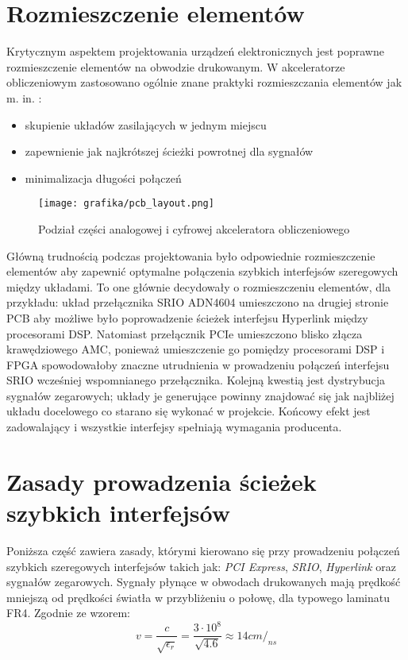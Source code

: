 \section{Rozmieszczenie elementów}
Krytycznym aspektem projektowania urządzeń elektronicznych jest poprawne rozmieszczenie elementów na obwodzie drukowanym. W akceleratorze obliczeniowym zastosowano ogólnie znane praktyki rozmieszczania elementów jak m. in. :
\begin{itemize}
\item
skupienie układów zasilających w jednym miejscu
\item
zapewnienie jak najkrótszej ścieżki powrotnej dla sygnałów
\item
minimalizacja długości połączeń
\end{itemize}

\begin{figure}[!ht]
\centering
\texttt{[image: grafika/pcb\_layout.png]}
\caption{Podział części analogowej i cyfrowej akceleratora obliczeniowego}
\end{figure}

Główną trudnością podczas projektowania było odpowiednie rozmieszczenie elementów aby zapewnić optymalne połączenia szybkich interfejsów szeregowych między układami. To one głównie decydowały o rozmieszczeniu elementów, dla przykładu: układ przełącznika SRIO ADN4604 umieszczono na drugiej stronie PCB aby możliwe było poprowadzenie ścieżek interfejsu Hyperlink między procesorami DSP. Natomiast przełącznik PCIe umieszczono blisko złącza krawędziowego AMC, ponieważ umieszczenie go pomiędzy procesorami DSP i FPGA spowodowałoby znaczne utrudnienia w prowadzeniu połączeń interfejsu SRIO wcześniej wspomnianego przełącznika. Kolejną kwestią jest dystrybucja sygnałów zegarowych; układy je generujące powinny znajdować się jak najbliżej układu docelowego co starano się wykonać w projekcie. Końcowy efekt jest zadowalający i wszystkie interfejsy spełniają wymagania producenta. 

\section{Zasady prowadzenia ścieżek szybkich interfejsów}

Poniższa część zawiera zasady, którymi kierowano się przy prowadzeniu połączeń szybkich szeregowych interfejsów takich jak: \textit{PCI Express}, \textit{SRIO}, \textit{Hyperlink} oraz sygnałów zegarowych. Sygnały płynące w obwodach drukowanych mają prędkość mniejszą od prędkości światła w przybliżeniu o połowę, dla typowego laminatu FR4. Zgodnie ze wzorem:
$$ v = \frac{c}{\sqrt{\epsilon_{r}}} = \frac{3 \cdot 10^8}{\sqrt{4.6}}  \approx 14{} {cm}/_{ns}  $$

